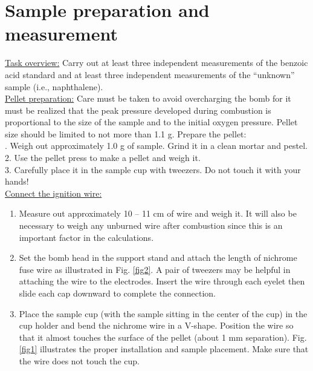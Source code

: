 \documentclass[byrevtex,amssymb,aps,pra,floatfix,letterpaper]{revtex4}
\begin{document}
\section{Sample preparation and measurement}

\noindent
\underline{Task overview:} Carry out at least three independent measurements of the benzoic acid standard and at least three independent measurements of the ``unknown'' sample (i.e., naphthalene).\\

\noindent
\underline{Pellet preparation:} Care must be taken to avoid overcharging the bomb for it must be realized that the peak pressure developed during combustion is proportional to the size of the sample and to the initial oxygen pressure. Pellet size should be limited to not more than 1.1 g. Prepare the pellet:\\

. Weigh out approximately 1.0 g of sample. Grind it in a clean mortar and pestel.\\
2. Use the pellet press to make a pellet and weigh it.\\
3. Carefully place it in the sample cup with tweezers. Do not touch it with your hands!\\

\noindent
\underline{Connect the ignition wire:}\\

\noindent
\begin{enumerate}
\item Measure out approximately 10 -- 11 cm of wire and weigh it. It will also be necessary to weigh any unburned wire after combustion since this is an important factor in the calculations.

\item Set the bomb head in the support stand and attach the length of nichrome fuse wire as illustrated in Fig. \ref{fig2}. A pair of tweezers may be helpful in attaching the wire to the electrodes. Insert the wire through each eyelet then slide each cap downward to complete the connection.

\item Place the sample cup (with the sample sitting in the center of the cup) in the cup holder and bend the nichrome wire in a V-shape. Position the wire so that it almost touches the surface of the pellet (about 1 mm separation). Fig. \ref{fig1} illustrates the proper installation and sample placement. Make sure that the wire does not touch the cup.
\end{enumerate}
\end{document}
